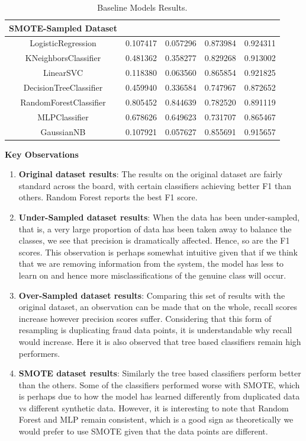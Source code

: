 \documentclass[12pt,a4paper,twoside]{report}
\begin{document}
\begin{table}[H]
\begin{tabular}{ccccc}
    \textbf{SMOTE-Sampled Dataset} \\  \midrule
    
    LogisticRegression & 0.107417 &  0.057296 & 0.873984  & 0.924311 \\
    KNeighborsClassifier &0.481362  & 0.358277 & 0.829268 & 0.913002\\
    LinearSVC  & 0.118380 &  0.063560 & 0.865854  & 0.921825 \\
    DecisionTreeClassifier & 0.459940  & 0.336584 & 0.747967 & 0.872652 \\
    RandomForestClassifier &  0.805452  & 0.844639 & 0.782520 & 0.891119\\
    MLPClassifier & 0.678626 &  0.649623 & 0.731707 & 0.865467 \\
    GaussianNB & 0.107921 &  0.057627 & 0.855691 & 0.915657 \\
    
   \bottomrule
 \end{tabular}
 \caption{Baseline Models Results.}
\label{table:baseline-results}
\end{table}

\textbf{Key Observations}
\begin{enumerate}
\item \textbf{Original dataset results}: The results on the original dataset are fairly standard across the board, with certain classifiers achieving better F1 than others. Random Forest reports the best F1 score. 

\item \textbf{Under-Sampled dataset results}: When the data has been under-sampled, that is, a very large proportion of data has been taken away to balance the classes, we see that precision is dramatically affected. Hence, so are the F1 scores. This observation is perhaps somewhat intuitive given that if we think that we are removing information from the system, the model has less to learn on and hence more misclassifications of the genuine class will occur. 

\item \textbf{Over-Sampled dataset results}: Comparing this set of results with the original dataset, an observation can be made that on the whole, recall scores increase however precision scores suffer. Considering that this form of resampling is duplicating fraud data points, it is understandable why recall would increase. Here it is also observed that tree based classifiers remain high performers. 

\item \textbf{SMOTE dataset results}: Similarly the tree based classifiers perform better than the others. Some of the classifiers performed worse with SMOTE, which is perhaps due to how the model has learned differently from duplicated data vs different synthetic data. However, it is interesting to note that Random Forest and MLP remain consistent, which is a good sign as theoretically we would prefer to use SMOTE given that the data points are different. 
 
\end{enumerate}
\end{document}
